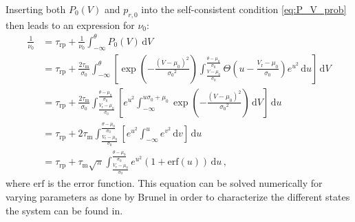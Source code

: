 Inserting both $P_0(V)$ and $p_{r, 0}$ into the self-consistent condition \eqref{eq:P_V_prob}
then leads to an expression for $\nu_0$:
\begin{equation}
    \begin{split}
        \frac{1}{\nu_0} 	
            &= \tau_\text{rp} + \frac{1}{\nu_0} \int_{-\infty}^{\theta} \! P_0(V) \, \text{d}V  \\ 
            &= \tau_\text{rp} + \frac{2 \tau_\text{m}}{\sigma_0} 
                \int_{-\infty}^{\theta} \! \left[ 
                    \exp{\left(- \frac{(V - \mu_0)^2}{{\sigma_0}^2} \right)}
                    \int_{\frac{V - \mu_0}{\sigma_0}}^{\frac{\theta - \mu_0}{\sigma_0}} \! 
                        \Theta \left(u - \frac{V_\text{r} - \mu_0}{\sigma_0} \right) e^{u^2} \, \text{d}u 
                    \right] \, \text{d}V  \\ 
            &= \tau_\text{rp} + \frac{2 \tau_\text{m}}{\sigma_0} 
                \int_{\frac{V_\text{r} - \mu_0}{\sigma_0}}^{\frac{\theta - \mu_0}{\sigma_0}} \! 
                    \left[ 
                        e^{u^2}
                        \int_{-\infty}^{u \sigma_0 + \mu_0} \! 
                        \exp{\left(- \frac{(V - \mu_0)^2}{{\sigma_0}^2} \right)}
                        \, \text{d}V
                    \right] \, \text{d}u  \\ 
            &= \tau_\text{rp} + 2 \tau_\text{m}
                \int_{\frac{V_\text{r} - \mu_0}{\sigma_0}}^{\frac{\theta - \mu_0}{\sigma_0}} \! 
                    \left[ 
                        e^{u^2}
                        \int_{-\infty}^{u} \! e^{v^2} \, \text{d}v
                    \right] \, \text{d}u  \\ 
            &= \tau_\text{rp} + \tau_\text{m} \sqrt{\pi}
                \int_{\frac{V_\text{r} - \mu_0}{\sigma_0}}^{\frac{\theta - \mu_0}{\sigma_0}} \! 
                e^{u^2} \left(1 + \text{erf}(u)\right)
                \, \text{d}u  \,,
        \label{eq:self_consistency}
    \end{split}
\end{equation}
where $\text{erf}$ is the error function. 
This equation can be solved numerically for varying parameters as done by Brunel in order to 
characterize the different states the system can be found in. 

